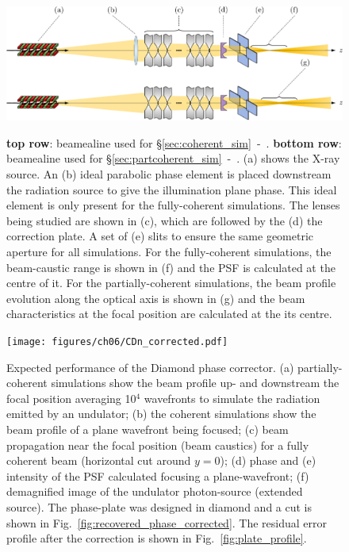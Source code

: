 \begin{refsection}
\begin{figure}[t]
        \centering
        {\includegraphics[width=0.8\linewidth]{figures/ch06/optical_setups_corrected.pdf}}
        \caption[Beamlines for coherent- and partially-coherent simulations]{\textbf{top row}: beamealine used for  \S\ref{sec:coherent_sim}~-~\textit{}. \textbf{bottom row}: beamealine used for  \S\ref{sec:partcoherent_sim}~-~\textit{}. (a) shows the X-ray source. An (b) ideal parabolic phase element is placed downstream the radiation source to give the illumination plane phase. This ideal element is only present for the fully-coherent simulations. The lenses being studied are shown in (c), which are followed by the (d) the correction plate. A set of (e) slits to ensure the same geometric aperture for all simulations. For the fully-coherent simulations, the beam-caustic range is shown in (f) and the PSF is calculated at the centre of it. For the partially-coherent simulations, the beam profile evolution along the optical axis is shown in (g) and the beam characteristics at the focal position are calculated at the its centre. 
        }\label{fig:optical_setups_corrected}
\end{figure}





\begin{figure}[h]
        \centering
        {\texttt{[image: figures/ch06/CDn\_corrected.pdf]}}
        \caption[Expected performance of the diamond phase corrector]{Expected performance of the Diamond phase corrector. (a) partially-coherent simulations show the beam profile up- and downstream the focal position averaging 10$^{4}$ wavefronts to simulate the radiation emitted by an undulator; (b) the coherent simulations show the beam profile of a plane wavefront being focused; (c) beam propagation near the focal position (beam caustics) for a fully coherent beam (horizontal cut around $y=0$); (d) phase and (e) intensity of the PSF calculated focusing a plane-wavefront; (f) demagnified image of the undulator photon-source (extended source). The phase-plate was designed in diamond and a cut is shown in Fig.~\ref{fig:recovered_phase_corrected}. The residual error profile after the correction is shown in Fig.~\ref{fig:plate_profile}.}\label{fig:CDn_corrected}
\end{figure}


\end{refsection}
